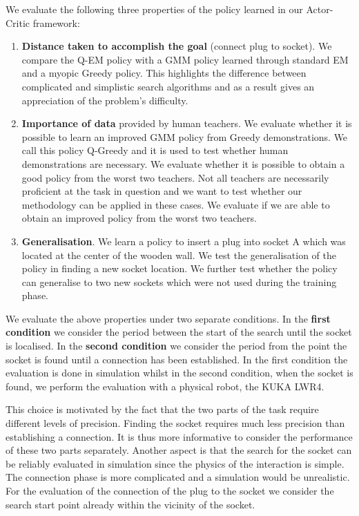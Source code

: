 We evaluate the following three properties of the policy learned in our Actor-Critic framework:
\begin{enumerate}
 \item \textbf{Distance taken to accomplish the goal} (connect plug to socket). We compare the Q-EM policy with 
 a GMM policy learned through standard EM and a myopic Greedy policy. This highlights the difference between complicated and simplistic  
  search algorithms and as a result gives an appreciation of the problem's difficulty.
 \item \textbf{Importance of data} provided by human teachers. We evaluate whether it is possible to learn 
 an improved GMM policy from Greedy demonstrations. We call this policy Q-Greedy and it is used to test whether 
 human demonstrations are necessary.
 We evaluate whether it is possible to obtain a good policy from the worst two teachers. Not all teachers 
 are necessarily proficient at the task in question and we want to test whether our methodology can be applied in these
 cases. We evaluate if we  are able to obtain an improved policy from the worst two teachers.
 \item \textbf{Generalisation}. We learn a policy to insert a plug into socket A which was located at the center of the wooden 
 wall. We test the generalisation of the policy in finding a new socket location. We further test whether the policy can generalise to two new sockets 
 which were not used during the training phase.
\end{enumerate}

We evaluate the above properties under two separate conditions. In the \textbf{first condition} we consider the period between the start 
of the search until the socket is localised. In the \textbf{second condition} we consider the period from the point the socket is found until
a connection has been established. In the first condition the evaluation is done in simulation whilst 
in the second condition, when the socket is found, we perform the evaluation with a physical robot, the KUKA LWR4.

This choice is motivated by the fact that the two parts of the task require different levels of precision.
Finding the socket requires much less precision than establishing a connection. It is thus
more informative to consider the performance of these two parts separately.
Another aspect is that the search for the socket can be reliably evaluated in simulation since the physics of the interaction
is simple. The connection phase is more complicated and a simulation would be unrealistic.
For the evaluation of the connection of the plug to the socket we consider the search start point already within 
the vicinity of the socket.

